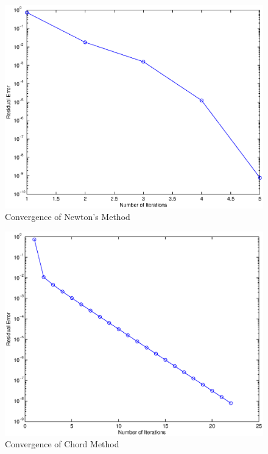 \documentclass[paper=a4, fontsize=11pt]{scrartcl} %
\numberwithin{equation}{section} %
\numberwithin{figure}{section} %
\numberwithin{table}{section} %
\begin{document}

\iffalse
\begin{center}

\begin{figure}[H]
\centerline{\includegraphics [scale = 0.5] {newtonfig.eps}}
\caption{Convergence of Newton's Method}
\end{figure}

\begin{figure}[H]
\centerline{\includegraphics [scale = 0.5] {chordfig.eps}}
\caption{Convergence of Chord Method}
\end{figure}


\end{center}
\end{document}
